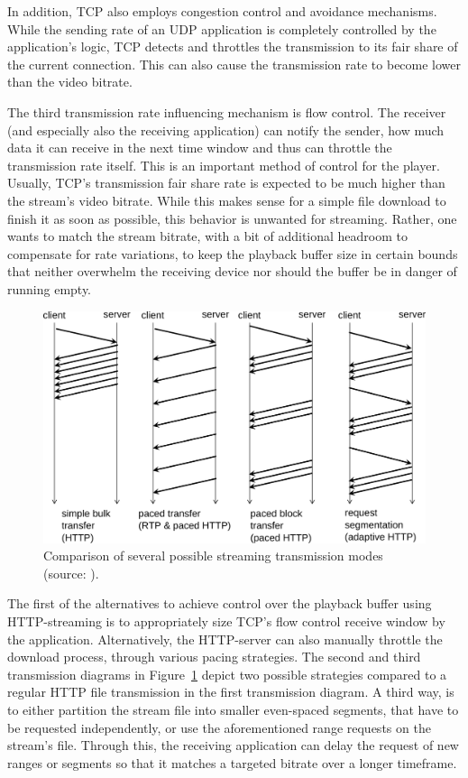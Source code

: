 In addition, \gls{TCP} also employs congestion control and avoidance mechanisms. While the sending rate of an \gls{UDP} application is completely controlled by the application's logic, \gls{TCP} detects and throttles the transmission to its fair share of the current connection. This can also cause the transmission rate to become lower than the video bitrate. 

The third transmission rate influencing mechanism is flow control. The receiver (and especially also the receiving application) can notify the sender, how much data it can receive in the next time window and thus can throttle the transmission rate itself. This is an important method of control for the player. Usually, \gls{TCP}'s transmission fair share rate is expected to be much higher than the stream's video bitrate. While this makes sense for a simple file download to finish it as soon as possible, this behavior is unwanted for streaming. Rather, one wants to match the stream bitrate, with a bit of additional headroom to compensate for rate variations, to keep the playback buffer size in certain bounds that neither overwhelm the receiving device nor should the buffer be in danger of running empty. 

\begin{figure}[htbp]
	\centering
	\includegraphics[width=1.0\textwidth]{images/streaming-transfer-modes.pdf}
	\caption{Comparison of several possible streaming transmission modes (source: \cite{ma2011mobile}).}
\label{c3:fig:streamingtransfermodes}
\end{figure}

The first of the alternatives to achieve control over the playback buffer using \gls{HTTP}-streaming is to appropriately size \gls{TCP}'s flow control receive window by the application. 
Alternatively, the \gls{HTTP}-server can also manually throttle the download process, through various pacing strategies. The second and third transmission diagrams in Figure~\ref{c3:fig:streamingtransfermodes} depict two possible strategies compared to a regular \gls{HTTP} file transmission in the first transmission diagram. A third way, is to either partition the stream file into smaller even-spaced segments, that have to be requested independently, or use the aforementioned range requests on the stream's file. Through this, the receiving application can delay the request of new ranges or segments so that it matches a targeted bitrate over a longer timeframe.

